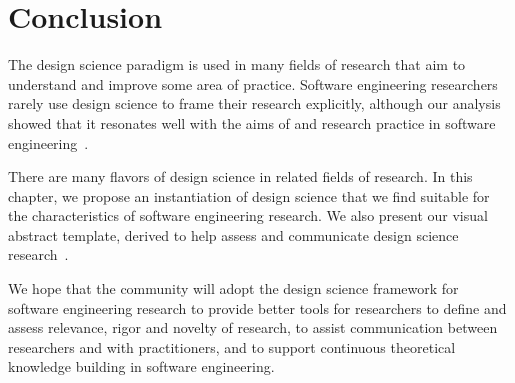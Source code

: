 \documentclass[graybox]{svmult}
\newcommand{\peggy}[1]{\textcolor{blue}{{\it [Peggy says: #1]}}}
\newcommand{\peggy}[1]{}
\begin{document}
\section{Conclusion}
\label{sec:conclusion}
The design science paradigm is used in many fields of research that aim to understand and improve some area of practice. Software engineering researchers rarely use design science to frame their research explicitly, although our analysis showed that it resonates well with the aims of and research practice in software engineering~\cite{Engstrom19arxiv}. 

There are many flavors of design science in related fields of research. In this chapter, we propose an instantiation %
of design science that we find suitable for the characteristics of software engineering research. We also present our visual abstract template, derived to help assess and communicate design science research~\cite{StoreyESEM17}. 

We hope that the community will adopt the design science framework for software engineering research to provide better tools for researchers to define and assess relevance, rigor and novelty of research, to assist communication between researchers and with practitioners, and to support continuous theoretical knowledge building in software engineering. 




\end{document}
